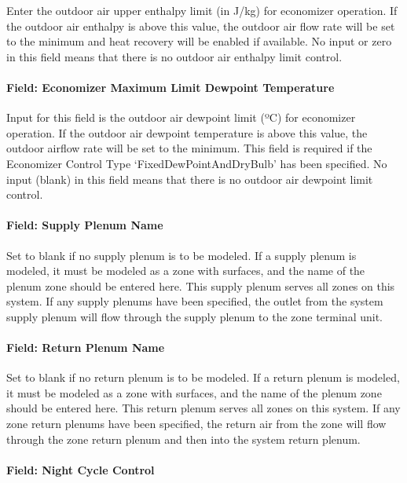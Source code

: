 Enter the outdoor air upper enthalpy limit (in J/kg) for economizer operation. If the outdoor air enthalpy is above this value, the outdoor air flow rate will be set to the minimum and heat recovery will be enabled if available. No input or zero in this field means that there is no outdoor air enthalpy limit control.

\paragraph{Field: Economizer Maximum Limit Dewpoint Temperature}\label{field-economizer-maximum-limit-dewpoint-temperature-5}

Input for this field is the outdoor air dewpoint limit (ºC) for economizer operation. If the outdoor air dewpoint temperature is above this value, the outdoor airflow rate will be set to the minimum. This field is required if the Economizer Control Type `FixedDewPointAndDryBulb' has been specified. No input (blank) in this field means that there is no outdoor air dewpoint limit control.

\paragraph{Field: Supply Plenum Name}\label{field-supply-plenum-name-10}

Set to blank if no supply plenum is to be modeled. If a supply plenum is modeled, it must be modeled as a zone with surfaces, and the name of the plenum zone should be entered here. This supply plenum serves all zones on this system. If any supply plenums have been specified, the outlet from the system supply plenum will flow through the supply plenum to the zone terminal unit.

\paragraph{Field: Return Plenum Name}\label{field-return-plenum-name-11}

Set to blank if no return plenum is to be modeled. If a return plenum is modeled, it must be modeled as a zone with surfaces, and the name of the plenum zone should be entered here. This return plenum serves all zones on this system. If any zone return plenums have been specified, the return air from the zone will flow through the zone return plenum and then into the system return plenum.

\paragraph{Field: Night Cycle Control}\label{field-night-cycle-control-4}

